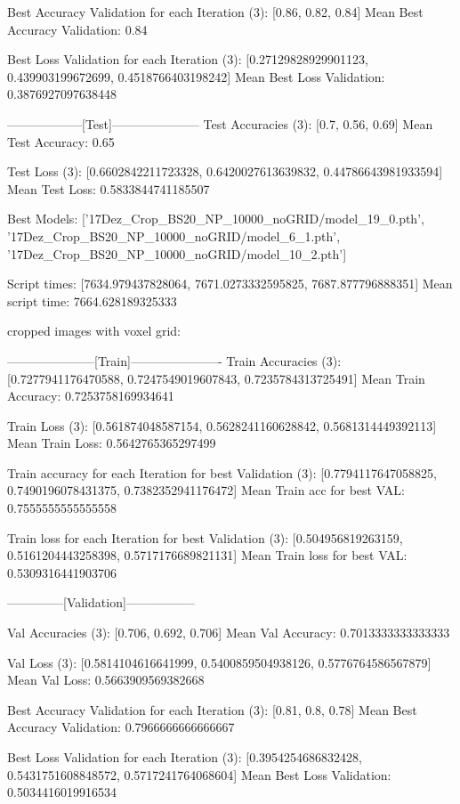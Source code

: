 Best Accuracy Validation for each Iteration (3): 
[0.86, 0.82, 0.84]
Mean Best Accuracy Validation: 0.84

Best Loss Validation for each Iteration (3): 
[0.27129828929901123, 0.439903199672699, 0.4518766403198242]
Mean Best Loss Validation: 0.3876927097638448


------------------[Test]---------------------
Test Accuracies (3): 
[0.7, 0.56, 0.69]
Mean Test Accuracy: 0.65

Test Loss (3): 
[0.6602842211723328, 0.6420027613639832, 0.44786643981933594]
Mean Test Loss: 0.5833844741185507

Best Models: 
['17Dez_Crop_BS20_NP_10000_noGRID/model_19_0.pth', '17Dez_Crop_BS20_NP_10000_noGRID/model_6_1.pth', '17Dez_Crop_BS20_NP_10000_noGRID/model_10_2.pth']



Script times: [7634.979437828064, 7671.0273332595825, 7687.877796888351]
Mean script time: 7664.628189325333







cropped images with voxel grid:

---------------------[Train]----------------------
Train Accuracies (3): 
[0.7277941176470588, 0.7247549019607843, 0.7235784313725491]
Mean Train Accuracy: 0.7253758169934641

Train Loss (3): 
[0.561874048587154, 0.5628241160628842, 0.5681314449392113]
Mean Train Loss: 0.5642765365297499

Train accuracy for each Iteration for best Validation (3): 
[0.7794117647058825, 0.7490196078431375, 0.7382352941176472]
Mean Train acc for best VAL: 0.7555555555555558

Train loss for each Iteration for best Validation (3): 
[0.504956819263159, 0.5161204443258398, 0.5717176689821131]
Mean Train loss for best VAL: 0.5309316441903706


--------------[Validation]-----------------

Val Accuracies (3): 
[0.706, 0.692, 0.706]
Mean Val Accuracy: 0.7013333333333333

Val Loss (3): 
[0.5814104616641999, 0.5400859504938126, 0.5776764586567879]
Mean Val Loss: 0.5663909569382668

Best Accuracy Validation for each Iteration (3): 
[0.81, 0.8, 0.78]
Mean Best Accuracy Validation: 0.7966666666666667

Best Loss Validation for each Iteration (3): 
[0.3954254686832428, 0.5431751608848572, 0.5717241764068604]
Mean Best Loss Validation: 0.5034416019916534


